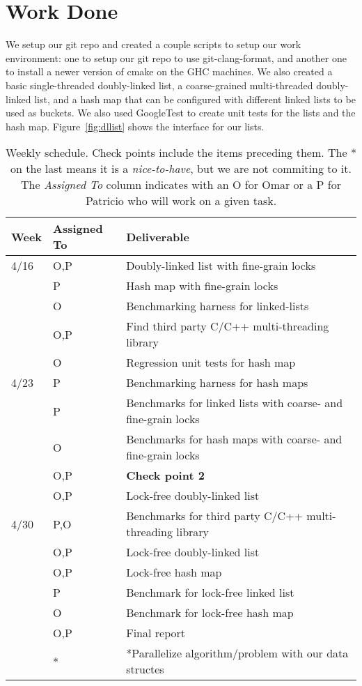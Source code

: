\documentclass[11pt]{article}
\begin{document}
\section*{Work Done}
We setup our git repo and created a couple scripts to setup our work
environment: one to setup our git repo to use git-clang-format, and another one
to install a newer version of cmake on the GHC machines. We also created a basic
single-threaded doubly-linked list, a coarse-grained multi-threaded
doubly-linked list, and a hash map that can be configured with different linked
lists to be used as buckets. We also used GoogleTest to create unit tests for
the lists and the hash map. Figure~\ref{fig:dllist} shows the interface for our
lists.

\begin{table}[t]
\begin{center}
\begin{tabular}{lll}
\toprule
\bf Week & \bf Assigned To  & \bf Deliverable   \\
\midrule
4/16     & O,P   & Doubly-linked list with fine-grain locks \\
         & P     & Hash map with fine-grain locks \\
         & O     & Benchmarking harness for linked-lists \\
         & O,P   & Find third party C/C++ multi-threading library \\
         & O     & Regression unit tests for hash map \\
4/23     & P     & Benchmarking harness for hash maps \\
         & P     & Benchmarks for linked lists with coarse- and fine-grain locks \\
         & O     & Benchmarks for hash maps with coarse- and fine-grain locks \\
         & O,P   & {\bf Check point 2} \\
         & O,P   & Lock-free doubly-linked list \\
4/30     & P,O   & Benchmarks for third party C/C++ multi-threading library \\
         & O,P   & Lock-free doubly-linked list \\
         & O,P   & Lock-free hash map \\
         & P     & Benchmark for lock-free linked list \\
         & O     & Benchmark for lock-free hash map \\
         & O,P   & Final report \\
         & *     & *Parallelize algorithm/problem with our data structes \\
\bottomrule
\end{tabular}
\caption{
Weekly schedule. Check points include the items preceding them. The * on the
last means it is a {\it nice-to-have}, but we are not commiting to it.
The {\it Assigned To} column indicates with an O for Omar or a P for Patricio
who will work on a given task.
}
\label{table:sche}
\end{center}
\end{table}
\end{document}
